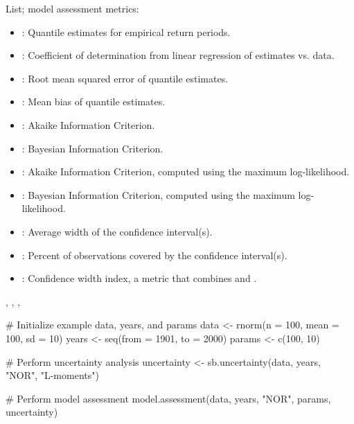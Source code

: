 \documentclass[a4paper]{book}
\begin{document}
\begin{Value}
List; model assessment metrics:
\begin{itemize}

\item{} : Quantile estimates for empirical return periods.
\item{} : Coefficient of determination from linear regression of estimates vs. data.
\item{} : Root mean squared error of quantile estimates.
\item{} : Mean bias of quantile estimates.
\item{} : Akaike Information Criterion.
\item{} : Bayesian Information Criterion.
\item{} : Akaike Information Criterion, computed using the maximum log-likelihood.
\item{} : Bayesian Information Criterion, computed using the maximum log-likelihood.
\item{} : Average width of the confidence interval(s).
\item{} : Percent of observations covered by the confidence interval(s).
\item{} : Confidence width index, a metric that combines  and .

\end{itemize}

\end{Value}
%
\begin{SeeAlso}
, ,
, 
\end{SeeAlso}
%
\begin{Examples}
\begin{ExampleCode}
# Initialize example data, years, and params
data <- rnorm(n = 100, mean = 100, sd = 10)
years <- seq(from = 1901, to = 2000)
params <- c(100, 10)

# Perform uncertainty analysis
uncertainty <- sb.uncertainty(data, years, "NOR", "L-moments")

# Perform model assessment
model.assessment(data, years, "NOR", params, uncertainty)

\end{ExampleCode}
\end{Examples}
\end{document}
